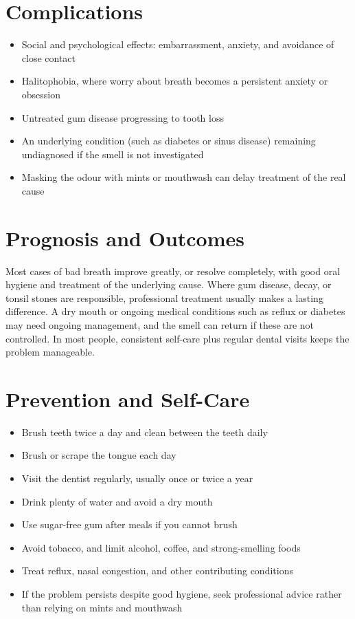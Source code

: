 \section*{Complications}
\begin{itemize}
    \item Social and psychological effects: embarrassment, anxiety, and avoidance of close contact
    \item Halitophobia, where worry about breath becomes a persistent anxiety or obsession
    \item Untreated gum disease progressing to tooth loss
    \item An underlying condition (such as diabetes or sinus disease) remaining undiagnosed if the smell is not investigated
    \item Masking the odour with mints or mouthwash can delay treatment of the real cause
\end{itemize}

\section*{Prognosis and Outcomes}
Most cases of bad breath improve greatly, or resolve completely, with good oral hygiene and treatment of the underlying cause. Where gum disease, decay, or tonsil stones are responsible, professional treatment usually makes a lasting difference. A dry mouth or ongoing medical conditions such as reflux or diabetes may need ongoing management, and the smell can return if these are not controlled. In most people, consistent self-care plus regular dental visits keeps the problem manageable.

\section*{Prevention and Self-Care}
\begin{itemize}
    \item Brush teeth twice a day and clean between the teeth daily
    \item Brush or scrape the tongue each day
    \item Visit the dentist regularly, usually once or twice a year
    \item Drink plenty of water and avoid a dry mouth
    \item Use sugar-free gum after meals if you cannot brush
    \item Avoid tobacco, and limit alcohol, coffee, and strong-smelling foods
    \item Treat reflux, nasal congestion, and other contributing conditions
    \item If the problem persists despite good hygiene, seek professional advice rather than relying on mints and mouthwash
\end{itemize}

